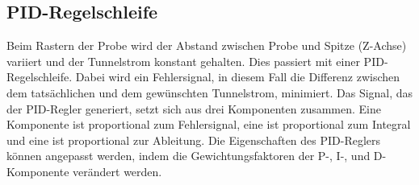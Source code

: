 \subsection{PID-Regelschleife}
Beim Rastern der Probe wird der Abstand zwischen Probe und Spitze (Z-Achse) variiert und der Tunnelstrom konstant gehalten.
Dies passiert mit einer PID-Regelschleife.
Dabei wird ein Fehlersignal, in diesem Fall die Differenz zwischen dem tatsächlichen und dem gewünschten Tunnelstrom, minimiert.
Das Signal, das der PID-Regler generiert, setzt sich aus drei Komponenten zusammen. Eine Komponente ist proportional zum Fehlersignal, eine ist proportional zum Integral und eine ist proportional zur Ableitung.
Die Eigenschaften des PID-Reglers können angepasst werden, indem die Gewichtungsfaktoren der P-, I-, und D-Komponente verändert werden.